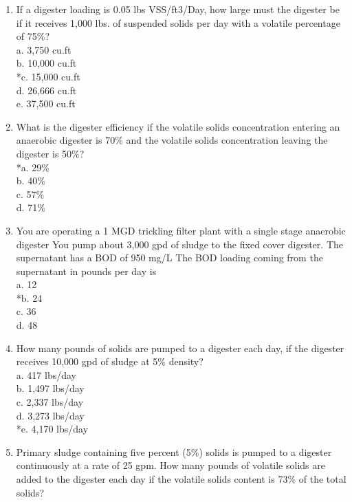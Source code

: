 \documentclass{article}
\begin{document}
\begin{enumerate}
\item  If a digester loading is 0.05 lbs VSS/ft3/Day, how large must the digester be if it receives 1,000 lbs. of suspended solids per day with a volatile percentage of 75\%? \\

a. 3,750 cu.ft \\
b. 10,000 cu.ft \\
*c. 15,000 cu.ft \\
d. 26,666 cu.ft \\
e. 37,500 cu.ft \\

\item  What is the digester efficiency if the volatile solids concentration entering an anaerobic digester is 70\% and the volatile solids concentration leaving the digester is 50\%? \\

*a. 29\% \\
b. 40\% \\
c. 57\% \\
d. 71\% \\

\item  You are operating a 1 MGD trickling filter plant with a single stage anaerobic digester You pump about 3,000 gpd of sludge to the fixed cover digester.  The supernatant has a BOD of 950 mg/L The BOD loading coming from the supernatant in pounds per day is \\

a. 12 \\
*b. 24 \\
c. 36 \\
d. 48 \\

\item  How many pounds of solids are pumped to a digester each day, if the digester receives 10,000 gpd of sludge at 5\% density? \\

a. 417 lbs/day \\
b. 1,497 lbs/day \\
c. 2,337 lbs/day \\
d. 3,273 lbs/day \\
*e. 4,170 lbs/day \\

\item  Primary sludge containing five percent (5\%) solids is pumped to a digester continuously at a rate of 25 gpm. How many pounds of volatile solids are added to the digester each day if the volatile solids content is 73\% of the total solids? \\


\end{enumerate}
\end{document}
